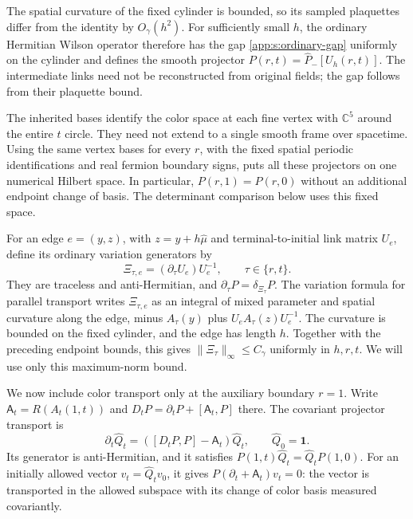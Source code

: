 \documentclass[11pt,a4paper]{article}
\theoremstyle{remark}
\newcommand{\Id}{\mathbf 1}
\begin{document}
The spatial curvature of the fixed cylinder is bounded, so its sampled
plaquettes differ from the identity by $O_\gamma(h^2)$. For sufficiently
small $h$, the ordinary Hermitian Wilson operator therefore has the gap
\eqref{app:s:ordinary-gap} uniformly on the cylinder and defines the
smooth projector $P(r,t)=\widehat P_-[U_h(r,t)]$.
The intermediate links need not be reconstructed from original fields;
the gap follows from their plaquette bound.

The inherited bases identify the color space at each fine vertex with
$\mathbb C^5$ around the entire $t$ circle. They need not extend to a
single smooth frame over spacetime. Using the same vertex bases for every
$r$, with the fixed spatial periodic identifications and real fermion
boundary signs, puts all these projectors on one numerical Hilbert space.
In particular, $P(r,1)=P(r,0)$ without an additional endpoint change of
basis. The determinant comparison below uses this fixed space.

For an edge $e=(y,z)$, with $z=y+h\hat\mu$ and terminal-to-initial
link matrix $U_e$, define its ordinary variation generators by
\begin{equation}
 \Xi_{\tau,e}=(\partial_\tau U_e)U_e^{-1},
 \qquad \tau\in\{r,t\}.
 \label{eq:ordinary-cylinder-variation}
\end{equation}
They are traceless and anti-Hermitian, and
$\partial_\tau P=\delta_{\Xi_\tau}P$.
The variation formula for parallel transport writes $\Xi_{\tau,e}$
as an integral of mixed parameter and spatial curvature along the edge,
minus $A_\tau(y)$ plus $U_eA_\tau(z)U_e^{-1}$.
The curvature is bounded on the fixed cylinder, and the edge has length
$h$. Together with the preceding endpoint bounds, this gives
$\|\Xi_\tau\|_\infty\le C_\gamma$ uniformly in $h,r,t$.
We will use only this maximum-norm bound.

We now include color transport only at the auxiliary boundary $r=1$.
Write $\mathsf A_t=R(A_t(1,t))$ and
$D_tP=\partial_tP+[\mathsf A_t,P]$ there. The covariant projector
transport is
\begin{equation}
 \partial_t\widehat Q_t
       =([D_tP,P]-\mathsf A_t)\widehat Q_t,\qquad
 \widehat Q_0=\Id.
\end{equation}
Its generator is anti-Hermitian, and it satisfies
$P(1,t)\widehat Q_t=\widehat Q_tP(1,0)$.
For an initially allowed vector $v_t=\widehat Q_tv_0$, it gives
$P(\partial_t+\mathsf A_t)v_t=0$: the vector is transported in the
allowed subspace with its change of color basis measured covariantly.
\end{document}
